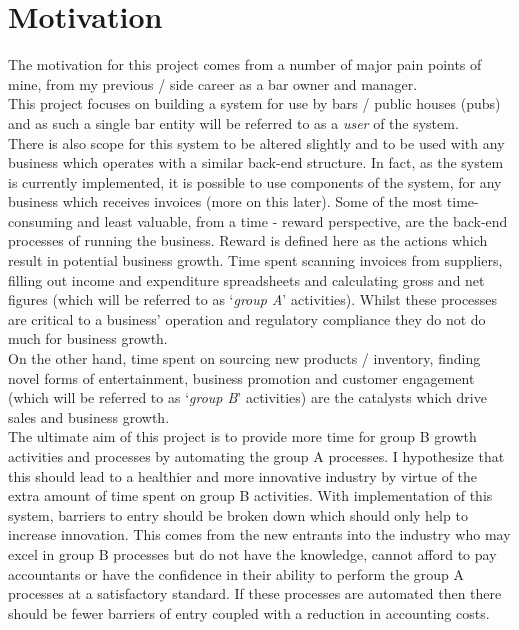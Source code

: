 \section{Motivation}
The motivation for this project comes from a number of major pain points of mine, from my previous / side career as a bar owner and manager. \\ This project focuses on building a system for use by
bars / public houses (pubs) and as such a single bar entity will be referred to as a \emph{user} of the system.\\
There is also scope for this system to be altered slightly and to be used with any business which operates with a similar back-end structure.
In fact, as the system is currently implemented, it is possible to use components of the system, for any business
which receives invoices (more on this later).
\bigbreak
Some of the most time-consuming and least valuable, from a time - reward perspective, are the back-end processes of running the business. Reward is defined here as the actions which result
in potential business growth. Time spent scanning invoices from suppliers, filling out income and expenditure spreadsheets and calculating gross and net figures (which will be referred to
as `\emph{group A}' activities). Whilst these processes are critical to a business' operation and regulatory compliance they do not do much for business growth.\\
On the other hand, time spent on sourcing new products / inventory, finding novel forms of entertainment, business promotion and customer engagement (which will be referred to as
`\emph{group B}' activities) are the catalysts which drive sales and business growth.\\
The ultimate aim of this project is to provide more time for group B growth activities and processes by automating the group A processes.
\bigbreak
I hypothesize that this should lead to a healthier and more innovative industry by virtue of the extra amount of time spent on group B activities. With implementation of this system,
barriers to entry should be broken down which should only help to increase innovation. This comes from the new entrants into the industry who may excel in group B processes but do not have
the knowledge, cannot afford to pay accountants or have the confidence in their ability to perform the group A processes at a satisfactory standard. If these processes are automated then
there should be fewer barriers of entry coupled with a reduction in accounting costs. \\
